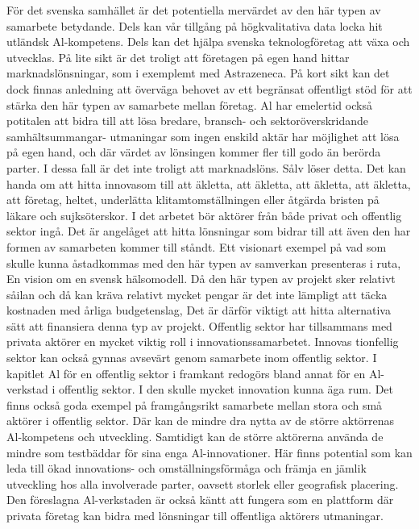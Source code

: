{{{{{{{{{{{{{{För det svenska samhället är det potentiella mervärdet av den här typen av samarbete betydande. Dels kan vår tillgång på högkvalitativa data locka hit utländsk Al-kompetens. Dels kan det hjälpa svenska teknologföretag att växa och utvecklas. På lite sikt är det troligt att företagen på egen hand hittar marknadslönsningar, som i exemplemt med Astrazeneca. På kort sikt kan det dock finnas anledning att överväga behovet av ett begränsat offentligt stöd för att stärka den här typen av samarbete mellan företag.
Al har emelertid också potitalen att bidra till att lösa bredare, bransch- och sektoröverskridande samhältsummangar- utmaningar som ingen enskild aktär har möjlighet att lösa på egen hand, och där värdet av lönsingen kommer fler till godo än berörda parter. I dessa fall är det inte troligt att marknadslöns. Sålv löser detta. Det kan handa om att hitta innovasom till att äkletta, att äkletta, att äkletta, att äkletta, att företag, heltet, underlätta klitamtomställningen eller åtgärda bristen på läkare och sujksöterskor. I det arbetet bör aktörer från både privat och offentlig sektor ingå. Det är angelåget att hitta lönsningar som bidrar till att även den har formen av samarbeten kommer till ståndt. Ett visionart exempel på vad som skulle kunna åstadkommas med den här typen av samverkan presenteras i ruta, En vision om en svensk hälsomodell. Då den här typen av projekt sker relativt såilan och då kan kräva relativt mycket pengar är det inte lämpligt att täcka kostnaden med årliga budgetenslag, Det är därför viktigt att hitta alternativa sätt att finansiera denna typ av projekt.
Offentlig sektor har tillsammans med privata aktörer en mycket viktig roll i innovationssamarbetet. Innovas tionfellig sektor kan också gynnas avsevärt genom samarbete inom offentlig sektor. I kapitlet Al för en offentlig sektor i framkant redogörs bland annat för en Al-verkstad i offentlig sektor. I den skulle mycket innovation kunna äga rum. Det finns också goda exempel på framgångsrikt samarbete mellan stora och små aktörer i offentlig sektor. Där kan de mindre dra nytta av de större aktörrenas Al-kompetens och utveckling. Samtidigt kan de större aktörerna använda de mindre som testbäddar för sina enga Al-innovationer. Här finns potential som kan leda till ökad innovations- och omställningsförmåga och främja en jämlik utveckling hos alla involverade parter, oavsett storlek eller geografisk placering. Den föreslagna Al-verkstaden är också käntt att fungera som en plattform där privata företag kan bidra med lönsningar till offentliga aktörers utmaningar.
}}}}}}}}}}}}}}
